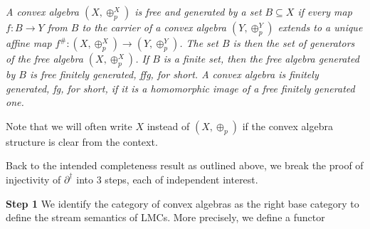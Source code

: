 \hypertarget{html:S4.Thmtheorem1.p2}{} \emph{A convex algebra %
\hypertarget{html:S4.Thmtheorem1.p2.m1}{}\({(X,\oplus^{X}_{p})}\) is \emph{free} and generated by a set %
\hypertarget{html:S4.Thmtheorem1.p2.m2}{}\({B\subseteq X}\) if every map %
\hypertarget{html:S4.Thmtheorem1.p2.m3}{}\({f\colon B\to Y}\) from %
\hypertarget{html:S4.Thmtheorem1.p2.m4}{}\({B}\) to the carrier of a convex algebra %
\hypertarget{html:S4.Thmtheorem1.p2.m5}{}\({(Y,\oplus^{Y}_{p})}\) extends to a unique affine map %
\hypertarget{html:S4.Thmtheorem1.p2.m6}{}\({f^{\#}\colon(X,\oplus^{X}_{p})\to(Y,\oplus^{Y}_{p})}\). The set %
\hypertarget{html:S4.Thmtheorem1.p2.m7}{}\({B}\) is then the set of generators of the free algebra %
\hypertarget{html:S4.Thmtheorem1.p2.m8}{}\({(X,\oplus^{X}_{p})}\). If %
\hypertarget{html:S4.Thmtheorem1.p2.m9}{}\({B}\) is a finite set, then the free algebra generated by %
\hypertarget{html:S4.Thmtheorem1.p2.m10}{}\({B}\) is \emph{free finitely generated}, \emph{ffg}, for short. A convex algebra is \emph{finitely generated}, \emph{fg}, for short, if it is a homomorphic image of a free finitely generated one.}
\par\medskip
\hypertarget{html:S4.p2}{} Note that we will often write %
\hypertarget{html:S4.p2.m1}{}\({X}\) instead of %
\hypertarget{html:S4.p2.m2}{}\({(X,\oplus_{p})}\) if the convex algebra structure is clear from the context.
\par\medskip
\hypertarget{html:S4.p3}{} Back to the intended completeness result as outlined above, we break the proof of injectivity of %
\hypertarget{html:S4.p3.m1}{}\({\partial^{\dagger}}\) into 3 steps, each of independent interest.
\par\medskip
\hypertarget{html:S4.SS0.SSSx1}{} \par\noindent\textbf{Step 1}\quad  %
\hypertarget{html:S4.SS0.SSSx1.p1}{} We identify the category of convex algebras as the right base category to define the stream semantics of LMCs. More precisely, we define a functor %
